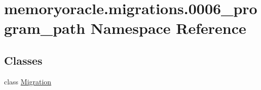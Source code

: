\hypertarget{namespacememoryoracle_1_1migrations_1_10006__program__path}{}\section{memoryoracle.\+migrations.0006\+\_\+program\+\_\+path Namespace Reference}
\label{namespacememoryoracle_1_1migrations_1_10006__program__path}
\subsection*{Classes}
\begin{DoxyCompactItemize}
\item 
class \hyperlink{classmemoryoracle_1_1migrations_1_10006__program__path_1_1Migration}{Migration}
\end{DoxyCompactItemize}
